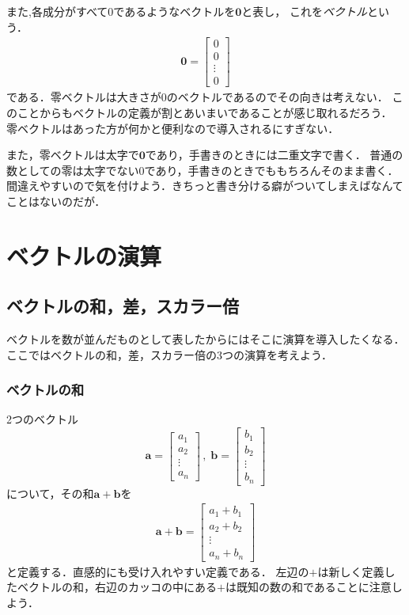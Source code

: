 また,各成分がすべて0であるようなベクトルを$\bm{0}$と表し，
これを\emph{ベクトル}という．
\begin{align}
\bm{0} = \left[
 \begin{array}{c}
   0 \\
   0 \\
   \vdots \\
   0
  \end{array}
   \right]
\label{eq:reivec}
\end{align}
である．零ベクトルは大きさが0のベクトルであるのでその向きは考えない．
このことからもベクトルの定義が割とあいまいであることが感じ取れるだろう．
零ベクトルはあった方が何かと便利なので導入されるにすぎない．

また，零ベクトルは太字で$\bm{0}$であり，手書きのときには二重文字で書く．
普通の数としての零は太字でない0であり，手書きのときでももちろんそのまま書く．
間違えやすいので気を付けよう．きちっと書き分ける癖がついてしまえばなんてことはないのだが．
\section{ベクトルの演算}
\subsection{ベクトルの和，差，スカラー倍}
ベクトルを数が並んだものとして表したからにはそこに演算を導入したくなる．
ここではベクトルの和，差，スカラー倍の3つの演算を考えよう．
\subsubsection{ベクトルの和}
2つのベクトル
$$
\bm{a} = \left[
 \begin{array}{c}
   a_1 \\
   a_2 \\
   \vdots \\
   a_n 
 \end{array}
            \right]
\, , \; 
\bm{b} = \left[
 \begin{array}{c}
   b_1 \\
   b_2 \\
   \vdots \\
   b_n 
 \end{array}
            \right]
$$
について，その和$\bm{a}+\bm{b}$を
\begin{align}
\bm{a}+\bm{b} = \left[
 \begin{array}{c}
   a_1+b_1 \\
   a_2+b_2 \\
   \vdots \\
   a_n+b_n 
 \end{array}
\right]
\label{eqn:vecsum}
\end{align}
と定義する．直感的にも受け入れやすい定義である．
左辺の$+$は新しく定義したベクトルの和，右辺のカッコの中にある$+$は既知の数の和であることに注意しよう．
